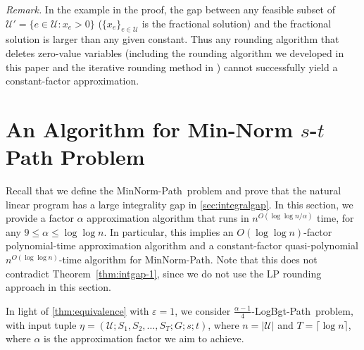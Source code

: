 \documentclass[11pt,a4paper]{article} \usepackage{enumitem}
\newcommand{\calU}{\mathcal{U}}
\newcommand{\minnormpath}{\textsf{MinNorm-Path}}
\newcommand{\LBOpath}{\textsf{LogBgt-Path}}
\theoremstyle{definition}
\begin{document}
\emph{Remark.} In the example in the proof,
the gap between any feasible subset of $\calU'=\{e\in\calU:x_e>0\}$ ($\{x_e\}_{e\in\calU}$ is the fractional solution) and the fractional solution is larger than any given constant. Thus any rounding algorithm that deletes zero-value variables (including the rounding algorithm  we developed in this paper and the iterative rounding method in \cite{chakrabarty2019approximation}) 
cannot successfully yield a constant-factor approximation.

 \section{An Algorithm for Min-Norm $s$-$t$ Path Problem}
\label{sec:algo-path}
Recall that we define the \minnormpath\ problem and prove that the natural linear program has a large integrality gap in \cref{sec:integralgap}. 
In this section, 
we provide a factor $\alpha$ approximation algorithm 
that runs in $n^{O(\log\log n/\alpha)}$ time,
for any $9\le \alpha\le \log\log n$. 
In particular, this implies an $O(\log\log n)$-factor polynomial-time approximation algorithm and a constant-factor quasi-polynomial $n^{O(\log\log n)}$-time algorithm for \minnormpath.
Note that this does not contradict 
Theorem~\ref{thm:intgap-1}, since we do not use the LP 
rounding approach in this section.

In light of \cref{thm:equivalence} with $\varepsilon=1$, we consider $\frac{\alpha-1}{4}$-\LBOpath\ problem,
with input tuple $\eta=(\calU;S_{1},S_{2},\ldots,S_{T};G;s;t)$, where $n=|\calU|$ and $T=\lceil \log n\rceil$, where 
$\alpha$ is the approximation factor we aim to achieve.
\end{document}
